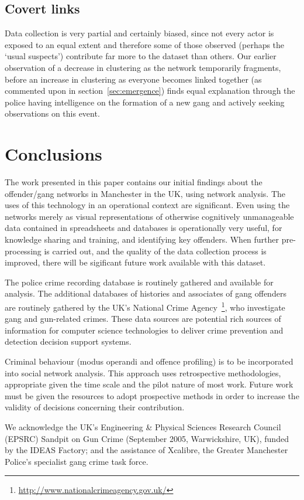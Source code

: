 \documentclass[twocolumn]{svjour3}          %
\theoremstyle{definition}
\begin{document}
\subsection{Covert links}

Data collection is very partial and certainly biased, since not every
actor is exposed to an equal extent and therefore some of those
observed (perhaps the `usual suspects') contribute far more to the
dataset than others. Our earlier observation of a decrease in
clustering as the network temporarily fragments, before an increase in
clustering as everyone becomes linked together (as commented upon in
section~\ref{sec:emergence}) finds equal explanation through the
police having intelligence on the formation of a new gang and actively
seeking observations on this event.

\section{Conclusions}\label{sec:conclusion}

The work presented in this paper contains our initial findings about
the offender/gang networks in Manchester in the UK, using network
analysis. The uses of this technology in an operational context are
significant. Even using the networks merely as visual representations
of otherwise cognitively unmanageable data contained in spreadsheets
and databases is operationally very useful, for knowledge sharing and
training, and identifying key offenders. When further pre-processing
is carried out, and the quality of the data collection process is
improved, there will be sigificant future work available with this
dataset.

The police crime recording database is routinely gathered and
available for analysis. The additional databases of histories and
associates of gang offenders are routinely gathered by the UK's
National Crime
Agency~\footnote{\url{http://www.nationalcrimeagency.gov.uk/}}, who
investigate gang and gun-related crimes. These data sources are
potential rich sources of information for computer science
technologies to deliver crime prevention and detection decision
support systems.

Criminal behaviour (modus operandi and offence profiling) is to be
incorporated into social network analysis.  This approach uses
retrospective methodologies, appropriate given the time scale and the
pilot nature of most work. Future work must be given the resources to
adopt prospective methods in order to increase the validity of
decisions concerning their contribution.

\begin{acknowledgements}
We acknowledge the UK's Engineering \& Physical Sciences Research
Council (EPSRC) Sandpit on Gun Crime (September 2005, Warwickshire,
UK), funded by the IDEAS Factory; and the assistance of Xcalibre, the Greater
Manchester Police's specialist gang crime task force.
\end{acknowledgements}

\end{document}
